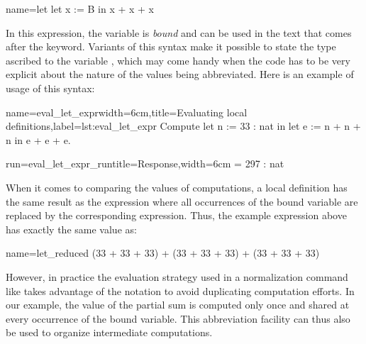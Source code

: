 \begin{coq}{name=let}{}
let x := B in
   x + x + x
\end{coq}

In this expression, the variable  is {\em bound} and can be used in
the text that comes after the  keyword.
Variants of this syntax make it possible to state the
type ascribed to the variable , which may come handy when the
code has to be very explicit about the nature of the values being
abbreviated.
Here is an example of usage of this syntax:

\begin{coq-left}{name=eval_let_expr}{width=6cm,title=Evaluating local definitions,label=lst:eval_let_expr}
Compute
  let n := 33 : nat in
  let e := n + n + n in
    e + e + e.
\end{coq-left}
\begin{coqout-right}{run=eval_let_expr_run}{title=Response,width=6cm}
 = 297 : nat
\end{coqout-right}

When it comes to comparing the values of computations, a local definition
has the same result as the expression where all occurrences of the bound
variable are replaced by the corresponding expression.  Thus, the example
expression above has exactly the same value as:

\begin{coq}{name=let_reduced}{}
(33 + 33 + 33) + (33 + 33 + 33) + (33 + 33 + 33)
\end{coq}

However, in practice the evaluation strategy used in a normalization
command like  takes advantage of the
  notation to
avoid duplicating computation efforts. In our example, the value of
the partial sum  is computed only once and shared at
every occurrence of the bound variable. This abbreviation facility can
thus also be used to organize intermediate computations.

